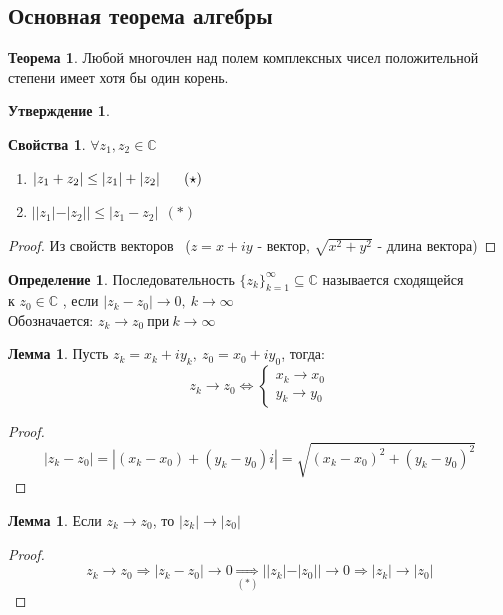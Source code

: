 \documentclass[a4paper, 12pt]{article}
\newcommand\tab[1][.5cm]{\hspace*{#1}}
\newcounter{lemcount}
\newcounter{lemcount2}
\theoremstyle{definition}
\newtheorem*{definition}{Определение}
\newtheorem*{theorem}{Теорема}
\newtheorem*{subtheorem}{Утверждение}
\newtheorem*{properties}{Свойства}
\newtheorem{lemmanum}[lemcount]{Лемма}
\begin{document}
  \subsection{Основная теорема алгебры}
  \begin{theorem}
    Любой многочлен над полем комплексных чисел положительной степени имеет хотя бы один корень.
  \end{theorem}
  \begin{subtheorem}\tab
    \begin{properties}\tab
      $\forall z_1, z_2 \in \mathbb{C}$
      \begin{enumerate} 
        \item $|z_1+z_2|\leq |z_1| + |z_2| \tab[0.61cm] (\star)$
        \item $||z_1|-|z_2||\leq |z_1-z_2| \ \ (*)$ 
      \end{enumerate}
      \begin{proof}
        Из свойств векторов \ ($z = x+iy$ - вектор, $\sqrt{x^2+y^2}$ - длина вектора)
      \end{proof} 
    \end{properties}
  \end{subtheorem}
  \begin{definition}
    Последовательность $\{z_k\}_{k=1}^{\infty} \subseteq \mathbb{C}$ называется сходящейся \\ к $z_0 \in \mathbb{C}$ , если $|z_k-z_0| \to 0, \ k\to \infty$\\
    Обозначается: $z_k \to z_0 \ \text{при} \ k\to \infty$ 
  \end{definition} 
  \setcounter{lemcount}{0}
  \begin{lemmanum}
    Пусть $z_k = x_k+iy_k, \ z_0 = x_0 + iy_0$, тогда:
    $$z_k \to z_0 \Longleftrightarrow \begin{cases}
      x_k \to x_0 \\
      y_k \to y_0
    \end{cases}$$  
  \end{lemmanum} 
  \begin{proof}
    $$|z_k-z_0|  = |(x_k - x_0) + (y_k - y_0)i| = \sqrt{(x_k - x_0)^2+(y_k - y_0)^2}$$ 
  \end{proof} 
  \begin{lemmanum}
    Если $z_k \to z_0$, то $|z_k| \to |z_0|$  
  \end{lemmanum} 
  \begin{proof}
    $$z_k \to z_0 \Longrightarrow |z_k - z_0| \to 0 \underset{(*)}{\Longrightarrow} ||z_k|-|z_0|| \to 0 \Longrightarrow |z_k| \to |z_0|$$ 
  \end{proof} 
\end{document}
